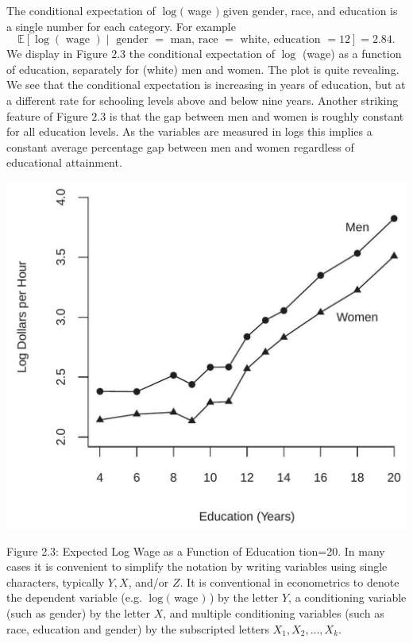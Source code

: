 \documentclass[10pt]{article}
\begin{document}
The conditional expectation of $\log ($ wage $)$ given gender, race, and education is a single number for each category. For example
$$
\mathbb{E}[\log (\text { wage }) \mid \text { gender }=\text { man, race }=\text { white, education }=12]=2.84 .
$$
We display in Figure $2.3$ the conditional expectation of $\log$ (wage) as a function of education, separately for (white) men and women. The plot is quite revealing. We see that the conditional expectation is increasing in years of education, but at a different rate for schooling levels above and below nine years. Another striking feature of Figure $2.3$ is that the gap between men and women is roughly constant for all education levels. As the variables are measured in logs this implies a constant average percentage gap between men and women regardless of educational attainment.

\includegraphics[max width=\textwidth]{2022_09_17_efa0deee3441d06e0b66g-07}

Figure 2.3: Expected Log Wage as a Function of Education tion=20. In many cases it is convenient to simplify the notation by writing variables using single characters, typically $Y, X$, and/or $Z$. It is conventional in econometrics to denote the dependent variable (e.g. $\log ($ wage $)$ ) by the letter $Y$, a conditioning variable (such as gender) by the letter $X$, and multiple conditioning variables (such as race, education and gender) by the subscripted letters $X_{1}, X_{2}, \ldots, X_{k}$.
\end{document}
